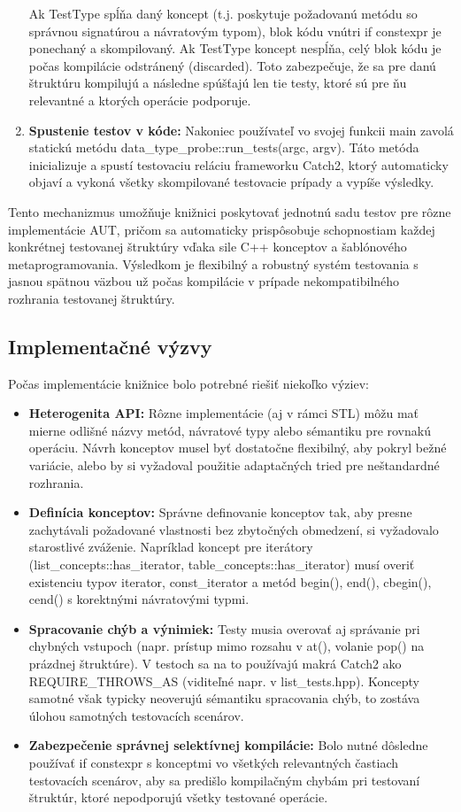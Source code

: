 \documentclass[11pt]{article}
\begin{document}
\begin{enumerate}
Ak TestType spĺňa daný koncept (t.j. poskytuje požadovanú metódu so správnou signatúrou a návratovým typom), blok kódu vnútri if constexpr je ponechaný a skompilovaný. Ak TestType koncept nespĺňa, celý blok kódu je počas kompilácie odstránený (discarded). Toto zabezpečuje, že sa pre danú štruktúru kompilujú a následne spúšťajú len tie testy, ktoré sú pre ňu relevantné a ktorých operácie podporuje.

\item \textbf{Spustenie testov v kóde:} Nakoniec používateľ vo svojej funkcii main zavolá statickú metódu data\_type\_probe::run\_tests(argc, argv). Táto metóda inicializuje a spustí testovaciu reláciu frameworku Catch2, ktorý automaticky objaví a vykoná všetky skompilované testovacie prípady a vypíše výsledky.
\end{enumerate}

Tento mechanizmus umožňuje knižnici poskytovať jednotnú sadu testov pre rôzne implementácie AUT, pričom sa automaticky prispôsobuje schopnostiam každej konkrétnej testovanej štruktúry vďaka sile C++ konceptov a šablónového metaprogramovania. Výsledkom je flexibilný a robustný systém testovania s jasnou spätnou väzbou už počas kompilácie v prípade nekompatibilného rozhrania testovanej štruktúry.

\subsection{Implementačné výzvy}

Počas implementácie knižnice bolo potrebné riešiť niekoľko výziev:
\begin{itemize}
  \item \textbf{Heterogenita API:} Rôzne implementácie (aj v rámci STL) môžu mať mierne odlišné názvy metód, návratové typy alebo sémantiku pre rovnakú operáciu. Návrh konceptov musel byť dostatočne flexibilný, aby pokryl bežné variácie, alebo by si vyžadoval použitie adaptačných tried pre neštandardné rozhrania.
  \item \textbf{Definícia konceptov:} Správne definovanie konceptov tak, aby presne zachytávali požadované vlastnosti bez zbytočných obmedzení, si vyžadovalo starostlivé zváženie. Napríklad koncept pre iterátory (list\_concepts::has\_iterator, table\_concepts::has\_iterator) musí overiť existenciu typov iterator, const\_iterator a metód begin(), end(), cbegin(), cend() s korektnými návratovými typmi.
  \item \textbf{Spracovanie chýb a výnimiek:} Testy musia overovať aj správanie pri chybných vstupoch (napr. prístup mimo rozsahu v at(), volanie pop() na prázdnej štruktúre). V testoch sa na to používajú makrá Catch2 ako REQUIRE\_THROWS\_AS (viditeľné napr. v list\_tests.hpp). Koncepty samotné však typicky neoverujú sémantiku spracovania chýb, to zostáva úlohou samotných testovacích scenárov.
  \item \textbf{Zabezpečenie správnej selektívnej kompilácie:} Bolo nutné dôsledne používať if constexpr s konceptmi vo všetkých relevantných častiach testovacích scenárov, aby sa predišlo kompilačným chybám pri testovaní štruktúr, ktoré nepodporujú všetky testované operácie.
\end{itemize}
\end{document}
